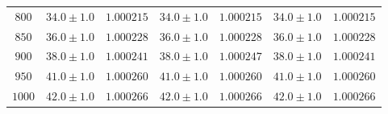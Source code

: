 \begin{table}
\begin{tabular}{c c c c c c c}
        $800 $ &    $34.0\pm1.0 $ & $ 1.000215$ & $ 34.0\pm1.0 $ & $	1.000215$ & $34.0\pm1.0 $ & $ 1.000215$ \\
        $850 $ &    $36.0\pm1.0 $ & $ 1.000228$ & $ 36.0\pm1.0 $ & $	1.000228$ & $36.0\pm1.0 $ & $ 1.000228$ \\
        $900 $ &    $38.0\pm1.0 $ & $ 1.000241$ & $ 38.0\pm1.0 $ & $	1.000247$ & $38.0\pm1.0 $ & $ 1.000241$ \\
        $950 $ &    $41.0\pm1.0 $ & $ 1.000260$ & $ 41.0\pm1.0 $ & $	1.000260$ & $41.0\pm1.0 $ & $ 1.000260$ \\
        $1000$ &	$42.0\pm1.0 $ & $ 1.000266$ & $ 42.0\pm1.0 $ & $	1.000266$ & $42.0\pm1.0 $ & $ 1.000266$ \\
        \bottomrule
    \end{tabular}
\end{table}
